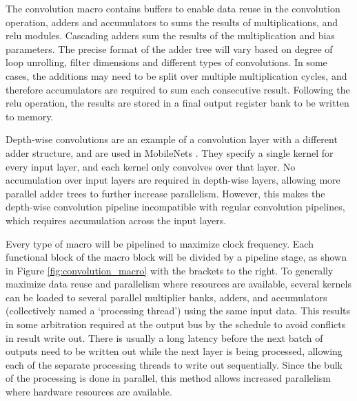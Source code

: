 \documentclass{uw-ece-wkrpt}
\begin{document}
The convolution macro contains buffers to enable data reuse in the convolution operation, adders and accumulators to sums the results of multiplications, and \gls{relu} modules. Cascading adders sum the results of the multiplication and \gls{bias} parameters. The precise format of the adder tree will vary based on degree of loop unrolling, \gls{filter} dimensions and different types of convolutions. In some cases, the additions may need to be split over multiple multiplication cycles, and therefore accumulators are required to sum each consecutive result. Following the \gls{relu} operation, the results are stored in a final output register bank to be written to memory.

Depth-wise convolutions are an example of a convolution layer with a different adder structure, and are used in MobileNets \cite{Howard2017MobileNets:-Eff}. They specify a single \gls{kernel} for every input layer, and each \gls{kernel} only convolves over that layer. No accumulation over input layers are required in depth-wise layers, allowing more parallel adder trees to further increase parallelism. However, this makes the depth-wise convolution pipeline incompatible with regular convolution pipelines, which requires accumulation across the input layers. %

Every type of macro will be pipelined to maximize clock frequency. Each functional block of the macro block will be divided by a pipeline stage, as shown in Figure \ref{fig:convolution_macro} with the brackets to the right. To generally maximize data reuse and parallelism where resources are available, several \glspl{kernel} can be loaded to several parallel multiplier banks, adders, and accumulators (collectively named a `processing thread') using the same input data. This results in some arbitration required at the output bus by the schedule to avoid conflicts in result write out. There is usually a long latency before the next batch of outputs need to be written out while the next layer is being processed, allowing each of the separate processing threads to write out sequentially. Since the bulk of the processing is done in parallel, this method allows increased parallelism where hardware resources are available.
\end{document}

